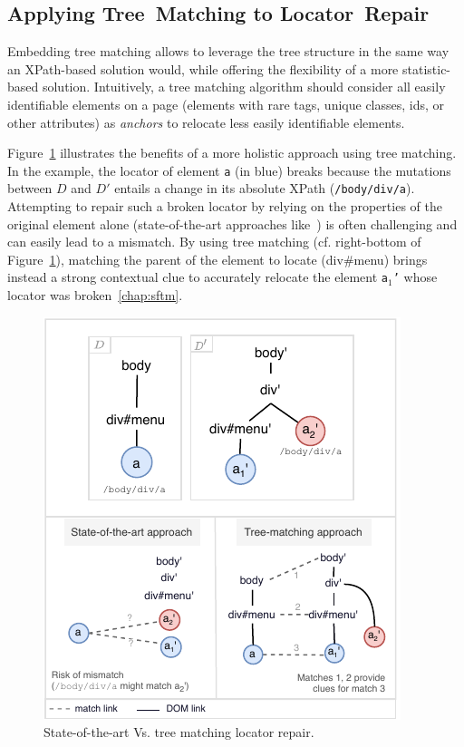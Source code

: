 \subsection{Applying Tree~Matching to Locator~Repair}
Embedding tree matching allows \erratum to leverage the tree structure in the same way an XPath-based solution would, while offering the flexibility of a more statistic-based solution.
Intuitively, a tree matching algorithm should consider all easily identifiable elements on a page (elements with rare tags, unique classes, ids, or other attributes) as \textit{anchors} to relocate less easily identifiable elements.

Figure~\ref{fig:holistic} illustrates the benefits of a more holistic approach using tree matching.
In the example, the locator of element \texttt{a} (in blue) breaks because the mutations between $D$ and $D'$ entails a change in its absolute XPath (\texttt{/body/div/a}).
Attempting to repair such a broken locator by relying on the properties of the original element alone (state-of-the-art approaches like~\cite{choudhary2011water,stocco2018visual}) is often challenging and can easily lead to a mismatch. 
By using tree matching (cf. right-bottom of Figure~\ref{fig:holistic}), matching the parent of the element to locate (\textsf{div\#menu}) brings instead a strong contextual clue to accurately relocate the element \texttt{a$_1$'} whose locator was broken~\ref{chap:sftm}.

\begin{figure}[]
    \centering
    \includegraphics[width=.8\linewidth]{erratum/holistic}
    \caption{State-of-the-art Vs. tree matching locator repair.}
    \label{fig:holistic}
\end{figure}

